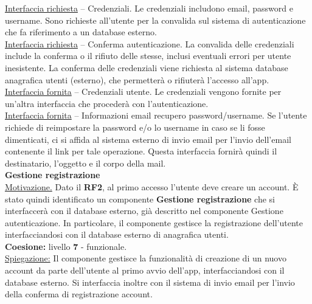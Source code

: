 \documentclass{article}
\begin{document}
      \underline{Interfaccia richiesta} – Credenziali. Le credenziali includono email, password e username. Sono richieste all’utente per la convalida sul sistema di autenticazione che fa
      riferimento a un database esterno.\\

      \underline{Interfaccia richiesta} – Conferma autenticazione. La convalida delle credenziali include la conferma o il rifiuto delle stesse, inclusi eventuali errori per utente inesistente. La
      conferma delle credenziali viene richiesta al sistema database anagrafica utenti (esterno), che permetterà o rifiuterà l’accesso all’app.\\

      \underline{Interfaccia fornita} – Credenziali utente. Le credenziali vengono fornite per un’altra interfaccia che procederà con l’autenticazione.\\

      \underline{Interfaccia fornita} – Informazioni email recupero password/username. Se l’utente richiede di reimpostare la password e/o lo username in caso se li fosse dimenticati, ci si
      affida al sistema esterno di invio email per l’invio dell'email contenente il link per tale operazione. Questa interfaccia fornirà quindi il destinatario, l’oggetto e il corpo
      della mail.\\


      {\Large\textbf{Gestione registrazione}}\\

      \underline{Motivazione.} Dato il \textbf{RF2}, al primo accesso l’utente deve creare un account. È stato quindi identificato un componente \textbf{Gestione registrazione} che si
      interfaccerà con il database esterno, già descritto nel componente Gestione autenticazione. In particolare, il componente gestisce la registrazione dell’utente interfacciandosi
      con il database esterno di anagrafica utenti.\\

      \textbf{Coesione:} livello \textbf{7} - funzionale.\\

      \underline{Spiegazione:} Il componente gestisce la funzionalità di creazione di un nuovo account da parte dell’utente al primo avvio dell’app, interfacciandosi con il database
      esterno. Si interfaccia inoltre con il sistema di invio email per l’invio della conferma di registrazione account.\\
\end{document}
